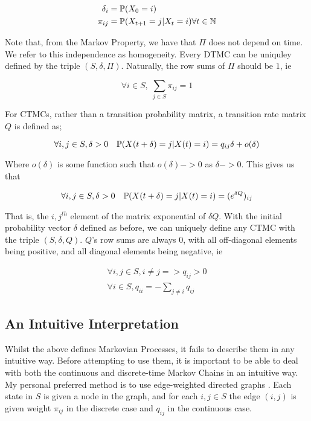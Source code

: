 \begin{align*}
\delta_i &= \mathbb{P} (X_0 = i) \\
\pi_{ij} &= \mathbb{P}(X_{t+1} = j | X_t = i) \forall t \in \mathbb{N}
\end{align*}

Note that, from the Markov Property, we have that $\Pi$ does not depend on time. We refer to this independence as homogeneity. Every DTMC can be uniquley defined by the triple $(S,\delta,\Pi)$. Naturally, the row sums of $\Pi$ should be $1$, ie

$$
\forall i \in S, \; \sum_{j \in S} \pi_{ij} = 1
$$

For CTMCs, rather than a transition probability matrix, a transition rate matrix $Q$ is defined as;

$$
\forall i,j \in S, \delta>0 \quad \mathbb{P} (X(t+\delta)=j|X(t)=i) = q_{ij}\delta + o(\delta)
$$

Where $o(\delta)$ is some function such that $o(\delta) -> 0$ as $\delta -> 0$. This gives us that

$$
\forall i,j \in S, \delta>0 \quad \mathbb{P} (X(t+\delta)=j|X(t)=i) = (e^{\delta Q})_{ij}
$$

That is, the $i,j^{th}$ element of the matrix exponential of $\delta Q$. With the initial probability vector $\delta$ defined as before, we can uniquely define any CTMC with the triple $(S,\delta,Q)$. $Q$'s row sums are always 0, with all off-diagonal elements being positive, and all diagonal elements being negative, ie

\begin{align*}
\forall i,j \in S, i \neq j => q_{ij} > 0 \\
\forall i \in S, q_{ii} = -\sum_{j \neq i} q_{ij}
\end{align*}

\subsection{An Intuitive Interpretation}

Whilst the above defines Markovian Processes, it fails to describe them in any intuitive way. Before attempting to use them, it is important to be able to deal with both the continuous and discrete-time Markov Chains in an intuitive way. My personal preferred method is to use edge-weighted directed graphs \cite{mwgraph}. Each state in $S$ is given a node in the graph, and for each $i,j \in S$ the edge $(i,j)$ is given weight $\pi_{ij}$ in the discrete case and $q_{ij}$ in the continuous case.

